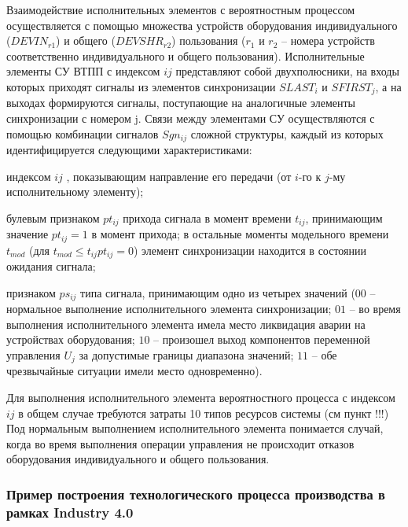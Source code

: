 Взаимодействие исполнительных элементов с вероятностным процессом осуществляется с помощью множества устройств оборудования индивидуального  ($DEVIN_{r1}$) и общего ($DEVSHR_{r2}$) пользования ($r_1$ и $r_2$ – номера устройств соответственно индивидуального и общего пользования). Исполнительные элементы СУ ВТПП с индексом $ij$ представляют собой двухполюсники, на входы которых приходят сигналы из элементов синхронизации $SLAST_i$ и $SFIRST_j$, а на выходах формируются сигналы, поступающие на аналогичные элементы синхронизации с номером j. Связи между элементами СУ осуществляются с помощью комбинации сигналов {$Sgn_{ij}$} сложной структуры, каждый из которых идентифицируется следующими характеристиками:
\begin{textitemize}
    \item индексом $ij$ , показывающим направление его передачи (от $i$-го к $j$-му исполнительному элементу);
    \item булевым признаком $pt_{ij}$ прихода сигнала в момент времени $t_{ij}$, принимающим значение  $pt_{ij}=1$ в момент прихода; в остальные моменты модельного времени $t_{mod}$ (для $t_{mod} \leq t_{ij} pt_{ij}=0$) элемент синхронизации находится в состоянии ожидания сигнала;
    \item признаком $ps_{ij}$ типа сигнала, принимающим одно из четырех значений ($00$ – нормальное выполнение исполнительного элемента синхронизации; $01$ – во время выполнения исполнительного элемента имела место ликвидация аварии на устройствах оборудования; $10$ – произошел выход компонентов переменной управления $U_j$ за допустимые границы диапазона значений; $11$ – обе чрезвычайные ситуации имели место одновременно).
\end{textitemize}


Для выполнения исполнительного элемента вероятностного процесса с индексом $ij$ в общем случае требуются затраты 10 типов ресурсов системы (см пункт !!!)
Под нормальным выполнением исполнительного элемента понимается случай, когда во время выполнения операции управления не происходит отказов оборудования индивидуального и общего пользования.



\subsubsection{Пример построения технологического процесса производства в рамках Industry 4.0}

